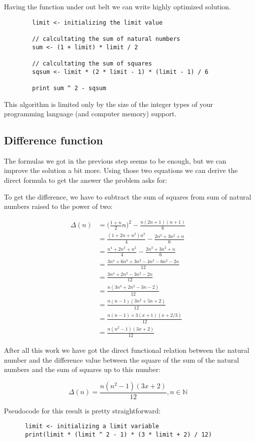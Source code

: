 \documentclass[14pt]{article}
\begin{document}
      Having the function under out belt we can write highly optimized solution. 

      \begin{verbatim}
        limit <- initializing the limit value

        // calcultating the sum of natural numbers
        sum <- (1 + limit) * limit / 2

        // calcultating the sum of squares
        sqsum <- limit * (2 * limit - 1) * (limit - 1) / 6

        print sum ^ 2 - sqsum
      \end{verbatim}
      
      This algorithm is limited only by the size of the integer types of your programming language (and computer
      memory) support.

  \subsection{Difference function}

    The formulas we got in the previous step seems to be enough, but we can improve the solution a bit more. Using those two equations we can derive the direct formula to get the answer the problem asks for:

    To get the difference, we have to subtract the sum of squares from sum of natural numbers raised to the power of two:

    $$
    \begin{aligned}
      \varDelta(n) &= \Big(\frac{1 + n}{2}n\Big)^2 - \frac{n(2n + 1)(n + 1)}{6}\\
        &= \frac{(1 + 2n + n^2)n^2}{4} - \frac{2n^3 + 3n^2 + n}{6} \\
        &= \frac{n^4 + 2n^3 + n^2}{4} - \frac{2n^3 + 3n^2 + n}{6} \\
        &= \frac{3n^4 + 6n^3 + 3n^2 - 4n^3 - 6n^2 - 2n}{12} \\
        &= \frac{3n^4 + 2n^3 - 3n^2 - 2n}{12} \\
        &= \frac{n(3n^3 + 2n^2 - 3n - 2)}{12} \\
        &= \frac{n(n - 1)(3n^2 + 5n + 2)}{12} \\
        &= \frac{n(n - 1) \times 3(x + 1)(x + 2/3)}{12} \\
        &= \frac{n(n^2 - 1)(3x + 2)}{12}
    \end{aligned}
    $$

    After all this work we have got the direct functional relation between the natural number and the difference value between the square of the sum of the natural numbers and the sum of squares up to this number:

    $$\varDelta(n) = \frac{n(n^2 - 1)(3x + 2)}{12}, n \in \mathbb{N}$$

    Pseudocode for this result is pretty straightforward:

    \begin{verbatim}
      limit <- initializing a limit variable
      print(limit * (limit ^ 2 - 1) * (3 * limit + 2) / 12)
    \end{verbatim}
  
\end{document}

